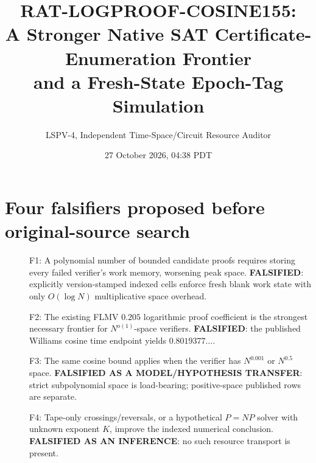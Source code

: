 \documentclass[11pt]{article}
\title{RAT-LOGPROOF-COSINE155:\\A Stronger Native SAT Certificate-Enumeration Frontier\\
and a Fresh-State Epoch-Tag Simulation}
\author{LSPV-4, Independent Time-Space/Circuit Resource Auditor}
\date{27 October 2026, 04:38 PDT}
\begin{document}
\maketitle
\begin{center}\end{center}

\section{Four falsifiers proposed before original-source search}
\begin{description}
\item[] F1: A polynomial number of bounded candidate proofs requires
storing every failed verifier's work memory, worsening peak space.
\textbf{FALSIFIED}: explicitly version-stamped indexed cells enforce fresh
blank work state with only $O(\log N)$ multiplicative space overhead.
\item[] F2: The existing FLMV $0.205$ logarithmic proof coefficient is
the strongest necessary frontier for $N^{o(1)}$-space verifiers.
\textbf{FALSIFIED}: the published Williams cosine time endpoint yields $0.8019377\ldots$.
\item[] F3: The same cosine bound applies when the verifier has
$N^{0.001}$ or $N^{0.5}$ space.
\textbf{FALSIFIED AS A MODEL/HYPOTHESIS TRANSFER}: strict subpolynomial
space is load-bearing; positive-space published rows are separate.
\item[] F4: Tape-only crossings/reversals, or a hypothetical $P=NP$
solver with unknown exponent $K$, improve the indexed numerical conclusion.
\textbf{FALSIFIED AS AN INFERENCE}: no such resource transport is present.
\end{description}
\end{document}
